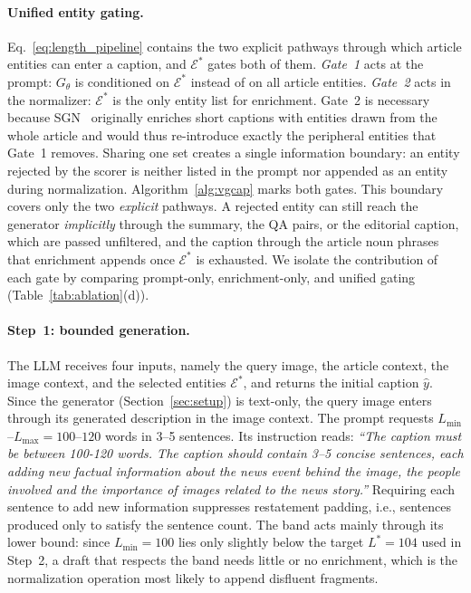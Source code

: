 \documentclass[runningheads]{llncs}
\DeclareRobustCommand{\aciids}[1]{{\color{olive}#1}}
\DeclareRobustCommand{\revise}[1]{{\color{olive}#1}}
\DeclareRobustCommand{\todo}[1]{\ifblank{#1}%
     {{\color{blue}\textbf{[TBD]}}}%
     {{\color{blue}\textbf{[#1]}}}}
\DeclareRobustCommand{\aciids}[1]{#1}
\DeclareRobustCommand{\revise}[1]{#1}
\DeclareRobustCommand{\todo}[1]{\PackageError{revision}{Unresolved TODO}{}}
\begin{document}
\paragraph{\aciids{Unified entity gating.}}
\label{sec:entity_conditioning}
\aciids{Eq.~\eqref{eq:length_pipeline} contains the two explicit pathways through which article entities can enter a caption, and $\mathcal{E}^{*}$ gates both of them. \emph{Gate~1} acts at the prompt: $G_{\theta}$ is conditioned on $\mathcal{E}^{*}$ instead of on all article entities. \emph{Gate~2} acts in the normalizer: $\mathcal{E}^{*}$ is the only \revise{entity list} for enrichment. Gate~2 is necessary because SGN~\cite{recap} originally enriches short captions with entities drawn from the whole article and would thus re-introduce exactly the peripheral entities that Gate~1 removes. Sharing one set creates a single information boundary: \revise{an entity rejected by the scorer is neither listed in the prompt nor appended as an entity during normalization.} Algorithm~\ref{alg:vgcap} marks both gates.}
\aciids{This boundary covers only the two \emph{explicit} pathways. A rejected entity can still reach the generator \emph{implicitly} through the summary, the QA pairs, or the editorial caption, which are passed unfiltered\revise{, and the caption through the article noun phrases that enrichment appends once $\mathcal{E}^{*}$ is exhausted}. We isolate the contribution of each gate by comparing prompt-only, enrichment-only, and unified gating (Table~\ref{tab:ablation}(d)).} %

\paragraph{\aciids{Step~1: bounded generation.}} \aciids{The LLM receives four inputs, namely the query image, the article context, the image context, and the selected entities $\mathcal{E}^{*}$, and returns the initial caption $\hat{y}$.} \revise{Since the generator (Section~\ref{sec:setup}) is text-only, the query image enters through its generated description in the image context.} The prompt requests $L_{\min}$--$L_{\max}=100$--$120$ words in 3--5 sentences. \revise{Its instruction reads: \emph{``The caption must be between 100-120 words. The caption should contain 3--5 concise sentences, each adding new factual information about the news event behind the image, the people involved and the importance of images related to the news story.''} Requiring each sentence to add new information suppresses restatement padding, i.e., sentences produced only to satisfy the sentence count.} \aciids{The band acts mainly through its lower bound: since $L_{\min}{=}100$ lies only slightly below the target $L^{*}{=}104$ used in Step~2, a draft that respects the band needs little or no enrichment, which is the normalization operation most likely to append disfluent fragments.} %
\end{document}
